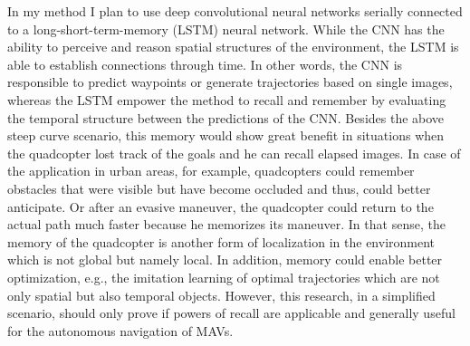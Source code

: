 In my method I plan to use deep convolutional neural networks serially connected to a long-short-term-memory (LSTM) neural network.
While the CNN has the ability to perceive and reason spatial structures of the environment,
the LSTM is able to establish connections through time. 
In other words, the CNN is responsible to predict waypoints or generate trajectories based on single images,
whereas the LSTM empower the method to recall and remember by evaluating the temporal structure between the predictions of the CNN.
Besides the above steep curve scenario, this memory would show great benefit in situations
when the quadcopter lost track of the goals and he can recall elapsed images.
In case of the application in urban areas, for example, 
quadcopters could remember obstacles that were visible but have become occluded and thus, could better anticipate. 
Or after an evasive maneuver, the quadcopter could return to the actual path much faster because he memorizes its maneuver.
In that sense, the memory of the quadcopter is another form of localization in the environment which is not global but namely local.
In addition, memory could enable better optimization, e.g., the imitation learning of optimal trajectories which
are not only spatial but also temporal objects.
However, this research, in a simplified scenario, should only prove if powers of recall are applicable and generally useful 
for the autonomous navigation of MAVs.











%
%
%




















